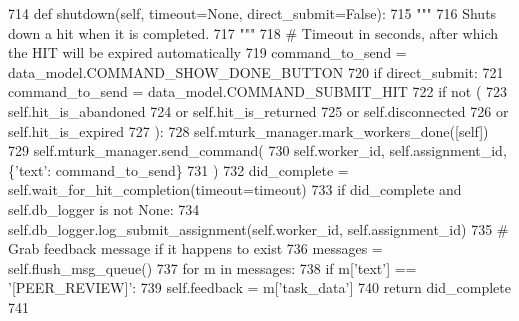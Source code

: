 \begin{DoxyCode}
714     \textcolor{keyword}{def }shutdown(self, timeout=None, direct\_submit=False):
715         \textcolor{stringliteral}{"""}
716 \textcolor{stringliteral}{        Shuts down a hit when it is completed.}
717 \textcolor{stringliteral}{        """}
718         \textcolor{comment}{# Timeout in seconds, after which the HIT will be expired automatically}
719         command\_to\_send = data\_model.COMMAND\_SHOW\_DONE\_BUTTON
720         \textcolor{keywordflow}{if} direct\_submit:
721             command\_to\_send = data\_model.COMMAND\_SUBMIT\_HIT
722         \textcolor{keywordflow}{if} \textcolor{keywordflow}{not} (
723             self.hit\_is\_abandoned
724             \textcolor{keywordflow}{or} self.hit\_is\_returned
725             \textcolor{keywordflow}{or} self.disconnected
726             \textcolor{keywordflow}{or} self.hit\_is\_expired
727         ):
728             self.mturk\_manager.mark\_workers\_done([self])
729             self.mturk\_manager.send\_command(
730                 self.worker\_id, self.assignment\_id, \{\textcolor{stringliteral}{'text'}: command\_to\_send\}
731             )
732             did\_complete = self.wait\_for\_hit\_completion(timeout=timeout)
733             \textcolor{keywordflow}{if} did\_complete \textcolor{keywordflow}{and} self.db\_logger \textcolor{keywordflow}{is} \textcolor{keywordflow}{not} \textcolor{keywordtype}{None}:
734                 self.db\_logger.log\_submit\_assignment(self.worker\_id, self.assignment\_id)
735             \textcolor{comment}{# Grab feedback message if it happens to exist}
736             messages = self.flush\_msg\_queue()
737             \textcolor{keywordflow}{for} m \textcolor{keywordflow}{in} messages:
738                 \textcolor{keywordflow}{if} m[\textcolor{stringliteral}{'text'}] == \textcolor{stringliteral}{'[PEER\_REVIEW]'}:
739                     self.feedback = m[\textcolor{stringliteral}{'task\_data'}]
740             \textcolor{keywordflow}{return} did\_complete
741 
\end{DoxyCode}
\mbox{\label{classparlai_1_1mturk_1_1core_1_1agents_1_1MTurkAgent_a1bb274c3d2fbfbe79f095ef27b42d820}} 
